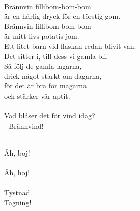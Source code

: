 
 \\       

\songtext{}Brännvin fillibom-bom-bom \\
är en härlig dryck för en törstig gom. \\
Brännvin fillibom-bom-bom \\
är mitt livs potatis-jom. \\
Ett litet barn vid flaskan redan blivit van. \\
Det sitter i, till dess vi gamla bli. \\
Så följ de gamla lagarna, \\
drick något starkt om dagarna, \\
för det är bra för magarna \\
och stärker vår aptit. \\


\vspace{0.15cm}
\melochtext{} \\
\songtext{}Vad blåser det för vind idag? \\
- Brännvind! 

\newpage


\vspace{0.15cm}
\melochtext{} \\
\songtext{}Åh, boj! \\


\vspace{0.15cm}
\melochtext{} \\
\songtext{}Åh, hoj!\\


\vspace{0.15cm}
\melochtext{}  \\
\songtext{}Tystnad... \\
Tagning! \\


 \\       

